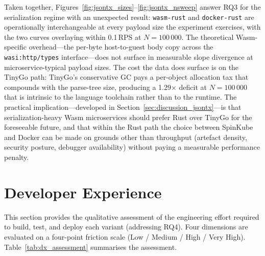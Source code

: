 \begin{sloppypar}
Taken together, Figures~\ref{fig:jsontx_sizes}--\ref{fig:jsontx_nsweep} answer RQ3 for the serialization regime with an unexpected result: \texttt{wasm-rust} and \texttt{docker-rust} are operationally interchangeable at every payload size the experiment exercises, with the two curves overlaying within 0.1\,\acs{RPS} at $N=100\,000$. The theoretical Wasm-specific overhead---the per-byte host-to-guest body copy across the \texttt{wasi:http/types} interface---does not surface in measurable slope divergence at micro\-service-typical payload sizes. The cost the data does surface is on the TinyGo path: TinyGo's conservative \acs{GC} pays a per-object allocation tax that compounds with the parse-tree size, producing a 1.29$\times$ deficit at $N=100\,000$ that is intrinsic to the language toolchain rather than to the runtime. The practical implication---developed in Section~\ref{sec:discussion_jsontx}---is that serialization-heavy \acs{Wasm} microservices should prefer Rust over TinyGo for the foreseeable future, and that within the Rust path the choice between SpinKube and Docker can be made on grounds other than throughput (artefact density, security posture, debugger availability) without paying a measurable performance penalty.
\end{sloppypar}

\section{Developer Experience}
\label{sec:eval_dx}

This section provides the qualitative assessment of the engineering effort required to build, test, and deploy each variant (addressing \acs{RQ4}). Four dimensions are evaluated on a four-point friction scale (Low / Medium / High / Very High). Table~\ref{tab:dx_assessment} summarises the assessment.

\begin{table}[htbp]
    \centering
    \caption{Developer experience friction assessment per variant and dimension.}
    \label{tab:dx_assessment}
\end{table}

